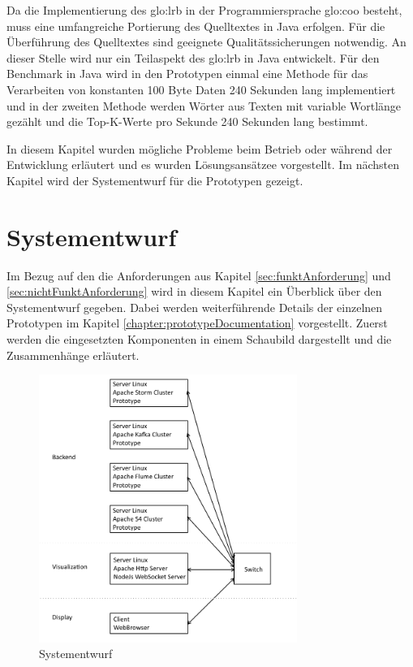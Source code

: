 Da die Implementierung des \gls{glo:lrb} in der Programmiersprache \gls{glo:coo} besteht, muss eine umfangreiche Portierung des Quelltextes in Java erfolgen. Für die Überführung des Quelltextes sind geeignete Qualitätssicherungen notwendig. An dieser Stelle wird nur ein Teilaspekt des \gls{glo:lrb} in Java entwickelt. Für den Benchmark in Java wird in den Prototypen einmal eine Methode für das Verarbeiten von konstanten 100 Byte Daten 240 Sekunden lang implementiert und in der zweiten Methode werden Wörter aus Texten mit variable Wortlänge gezählt und die Top-K-Werte pro Sekunde 240 Sekunden lang bestimmt. 

In diesem Kapitel wurden mögliche Probleme beim Betrieb oder während der Entwicklung erläutert und es wurden Lösungsansätzee vorgestellt. Im nächsten Kapitel wird der Systementwurf für die Prototypen gezeigt.

\section{Systementwurf}
\label{sec:systementwurf}

Im Bezug auf den die Anforderungen aus Kapitel \ref{sec:funktAnforderung} und \ref{sec:nichtFunktAnforderung} wird in diesem Kapitel ein Überblick über den Systementwurf gegeben. Dabei werden weiterführende Details der einzelnen Prototypen im Kapitel \ref{chapter:prototypeDocumentation} vorgestellt. Zuerst werden die eingesetzten Komponenten in einem Schaubild dargestellt und die Zusammenhänge erläutert.  

\begin{figure}[htb!]
\centering
\includegraphics[width=0.75\textwidth]{bilder/Systementwurf.png}
\caption{Systementwurf
\label{fig:systementwurf}}
\end{figure}

